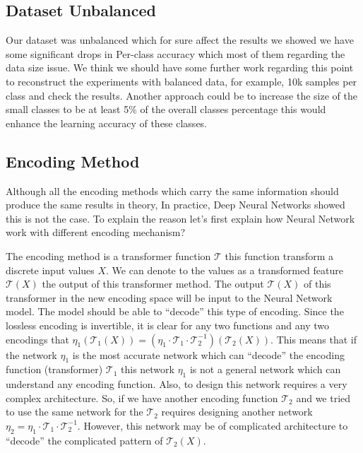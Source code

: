 \subsection{Dataset Unbalanced}

Our dataset was unbalanced which for sure affect the results we showed we have some significant drops in Per-class accuracy which most of them regarding the data size issue. We think we should have some further work regarding this point to reconstruct the experiments with balanced data, for example, 10k samples per class and check the results. Another approach could be to increase the size of the small classes to be at least 5\% of the overall classes percentage this would enhance the learning accuracy of these classes.  
\subsection{Encoding Method}

Although all the encoding methods which carry the same information should produce the same results in theory, In practice, Deep Neural Networks showed this is not the case. To explain the reason let’s first explain how Neural Network work with different encoding mechanism?

The encoding method is a transformer function $\mathcal{T}$ this function transform a discrete input values $X$. We can denote to the values as a transformed feature $\mathcal{T}(X)$ the output of this transformer method. The output $\mathcal{T}(X)$ of this transformer in the new encoding space will be input to the Neural Network model. The model should be able to ``decode''  this type of encoding. Since the lossless encoding is invertible, it is clear for any two functions and any two encodings that $\eta_1\left(\mathcal{T}_1(X)\right) = \left(\eta_1\cdot\mathcal{T}_1\cdot \mathcal{T}_2^{-1} \right)\left(\mathcal{T}_2(X)\right)$. This means that if the network $\eta_1$ is the most accurate network which can ``decode'' the encoding function (transformer) $\mathcal{T}_1$ this network $\eta_1$ is not a general network which can understand any encoding function. Also, to design this network requires a very complex architecture. So, if we have another encoding function $\mathcal{T}_2$ and we tried to use the same network for the $\mathcal{T}_2$ requires designing another network $\eta_2 = \eta_1\cdot\mathcal{T}_1\cdot \mathcal{T}_2^{-1}$. However, this network may be of complicated architecture to ``decode'' the complicated pattern of $\mathcal{T}_2(X)$.

